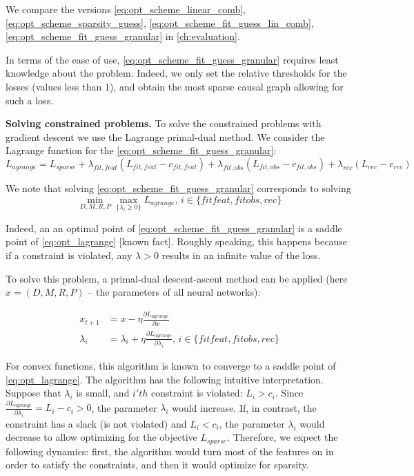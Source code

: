 \documentclass[a4paper,11pt,oneside]{report}
\begin{document}
We compare the versions \ref{eq:opt_scheme_linear_comb}, \ref{eq:opt_scheme_sparsity_guess}, \ref{eq:opt_scheme_fit_guess_lin_comb}, \ref{eq:opt_scheme_fit_guess_granular} in \autoref{ch:evaluation}.

In terms of the ease of use, \autoref{eq:opt_scheme_fit_guess_granular} requires least knowledge about the problem. Indeed, we only set the relative thresholds for the losses (values less than $1$), and obtain the most sparse causal graph allowing for such a loss.

{\bf Solving constrained problems.} To solve the constrained problems with gradient descent we use the Lagrange primal-dual method. We consider the Lagrange function for the \autoref{eq:opt_scheme_fit_guess_granular}:
$$
L_{agrange}=L_{sparse}+\lambda_{fit, feat}(L_{fit, feat}-c_{fit, feat})+\lambda_{fit, obs}(L_{fit, obs}-c_{fit, obs})+\lambda_{rec}(L_{rec}-c_{rec})
$$

We note that solving \autoref{eq:opt_scheme_fit_guess_granular} corresponds to solving
\begin{equation}
\label{eq:opt_lagrange}
\min\limits_{D,M,R,P}\max\limits_{\{\lambda_i\geq 0\}}L_{agrange},\,i\in\{fitfeat, fitobs, rec\}
\end{equation}

Indeed, an an optimal point of \autoref{eq:opt_scheme_fit_guess_granular} is a saddle point of \autoref{eq:opt_lagrange} [known fact]. Roughly speaking, this happens because if a constraint is violated, any $\lambda>0$ results in an infinite value of the loss.

To solve this problem, a primal-dual descent-ascent method can be applied (here $x=(D,M,R,P)$ -- the parameters of all neural networks):

\begin{equation}
\label{eq:primaldual}
\begin{array}{rl}
x_{t+1}&=x-\eta\frac{\partial L_{agrange}}{\partial x}\\
\lambda_i&=\lambda_i+\eta\frac{\partial L_{agrange}}{\partial \lambda_i},\,i\in\{fitfeat,fitobs,rec\}
\end{array}
\end{equation}

For convex functions, this algorithm is known to converge to a saddle point of \autoref{eq:opt_lagrange}. The algorithm has the following intuitive interpretation. Suppose that $\lambda_i$ is small, and $i'th$ constraint is violated: $L_i>c_i$. Since $\frac{\partial L_{agrange}}{\partial \lambda_i}=L_i-c_i>0$, the parameter $\lambda_i$ would increase. If, in contrast, the constraint has a slack (is not violated) and $L_i<c_i$, the parameter $\lambda_i$ would decrease to allow optimizing for the objective $L_{sparse}$.
Therefore, we expect the following dynamics: first, the algorithm would turn most of the features on in order to satisfy the constraints, and then it would optimize for sparsity.
\end{document}
